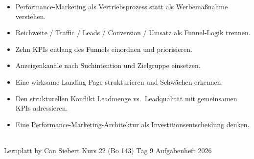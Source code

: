 \documentclass[11pt,a4paper,oneside]{article}
\begin{document}
\medskip
\begin{infobox}
\begin{itemize}
  \item Performance-Marketing als Vertriebsprozess statt als Werbemaßnahme verstehen.
  \item Reichweite / Traffic / Leads / Conversion / Umsatz als Funnel-Logik trennen.
  \item Zehn KPIs entlang des Funnels einordnen und priorisieren.
  \item Anzeigenkanäle nach Suchintention und Zielgruppe einsetzen.
  \item Eine wirksame Landing Page strukturieren und Schwächen erkennen.
  \item Den strukturellen Konflikt Leadmenge vs.\ Leadqualität mit gemeinsamen KPIs adressieren.
  \item Eine Performance-Marketing-Architektur als Investitionsentscheidung denken.
\end{itemize}
\end{infobox}

\vspace{1cm}
\noindent{\color{lpAccent}\rule{\linewidth}{0.6pt}}\\[4pt]
{\footnotesize\sffamily\color{lpGray}Lernplatt \textperiodcentered{} by Can Siebert \textperiodcentered{} Kurs 22 (Bo 143) \textperiodcentered{} Tag 9 \textperiodcentered{} Aufgabenheft \textperiodcentered{} \textcopyright{} 2026}
\end{document}
